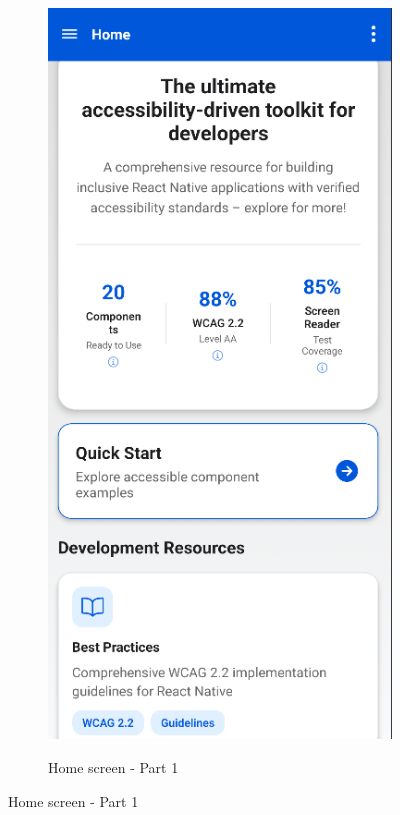 \begin{figure}[ht]
\begin{subfigure}[b]{0.48\textwidth}
        \includegraphics[width=\linewidth, alt={First part of the Home Screen}]{img/home1.png}
        \caption{Home screen - Part 1}

\end{subfigure}
\end{figure}
